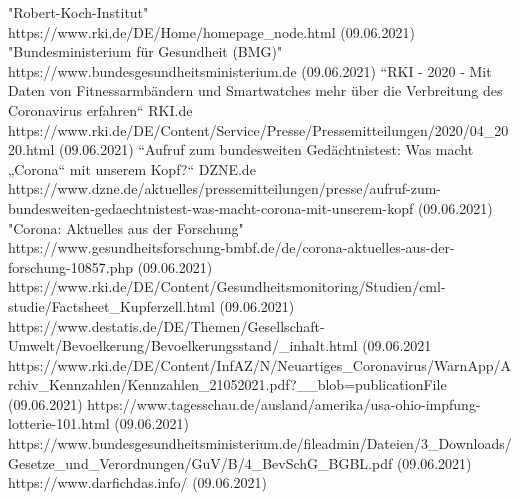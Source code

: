 \documentclass[conference]{IEEEtran}
\begin{document}
\begin{thebibliography}{00}
 "Robert-Koch-Institut" \\ https://www.rki.de/DE/Home/homepage\_node.html (09.06.2021)
 "Bundesministerium für Gesundheit (BMG)" \\ https://www.bundesgesundheitsministerium.de (09.06.2021)
 “RKI - 2020 - Mit Daten von Fitnessarmbändern und Smartwatches mehr über die Verbreitung des Coronavirus erfahren“ RKI.de \\ https://www.rki.de/DE/Content/Service/Presse/Pressemitteilungen/2020/04\_2020.html (09.06.2021)
 “Aufruf zum bundesweiten Gedächtnistest: Was macht „Corona“ mit unserem Kopf?“ DZNE.de \\https://www.dzne.de/aktuelles/pressemitteilungen/presse/aufruf-zum-bundesweiten-gedaechtnistest-was-macht-corona-mit-unserem-kopf (09.06.2021)
 "Corona: Aktuelles aus der Forschung" \\https://www.gesundheitsforschung-bmbf.de/de/corona-aktuelles-aus-der-forschung-10857.php (09.06.2021)
 https://www.rki.de/DE/Content/Gesundheitsmonitoring/Studien/cml-studie/Factsheet\_Kupferzell.html (09.06.2021)
 https://www.destatis.de/DE/Themen/Gesellschaft-Umwelt/Bevoelkerung/Bevoelkerungsstand/\_inhalt.html (09.06.2021
 https://www.rki.de/DE/Content/InfAZ/N/Neuartiges\_Coronavirus/WarnApp/Archiv\_Kennzahlen/Kennzahlen\_21052021.pdf?\_\_blob=publicationFile (09.06.2021)
 https://www.tagesschau.de/ausland/amerika/usa-ohio-impfung-lotterie-101.html (09.06.2021)
 https://www.bundesgesundheitsministerium.de/fileadmin/Dateien/3\_Downloads/Gesetze\_und\_Verordnungen/GuV/B/4\_BevSchG\_BGBL.pdf (09.06.2021)
 https://www.darfichdas.info/ (09.06.2021)

\end{thebibliography}
\vspace{12pt}
\end{document}
